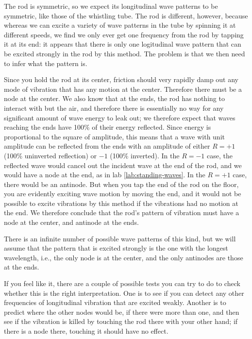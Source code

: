 The rod is symmetric, so we expect its longitudinal wave patterns
to be symmetric, like those of the whistling tube. The rod is different,
however, because whereas we can excite a variety of wave patterns in the
tube by spinning it at different speeds, we find we only ever get one
frequency from the rod by tapping it at its end: it appears that there is
only one logitudinal wave pattern that can be excited strongly in the
rod by this method. The problem is that we then need to infer what the
pattern is.

Since you hold the rod at its center, friction should very
rapidly damp out any mode of vibration that has any motion at the center.
Therefore there must be a node at the center. We also know that at the ends,
the rod has nothing to interact with but the air, and therefore there is
essentially no way for any significant amount of wave energy to leak out;
we therefore expect that waves reaching the ends have 100\% of their energy
reflected. Since energy is proportional to the square of amplitude, this means
that a wave with unit amplitude can be reflected from the ends with an amplitude
of either $R=+1$ (100\% uninverted reflection) or $-1$ (100\% inverted). In the $R=-1$
case, the reflected wave would cancel out the incident wave at the end of the rod, and
we would have a node at the end, as in lab \ref{lab:standing-waves}. In the $R=+1$ case,
there would be an antinode. But when you tap the end of the rod on the floor, you are
evidently exciting wave motion by moving the end, and it would not be possible to excite
vibrations by this method if the vibrations had no motion at the end. We therefore conclude
that the rod's pattern of vibration must have a node at the center, and antinode at the ends.

There is an infinite number of possible wave patterns of this kind, but we will assume
that the pattern that is excited strongly is the one with the longest wavelength, i.e.,
the only node is at the center, and the only antinodes are those at the ends.

If you feel like it, there are a couple of possible tests you can try to do to check whether this
is the right interpretation. One is to see if you can detect any other frequencies of longitudinal
vibration that are
excited weakly. Another is to predict where the other nodes would be, if there were more than one,
and then see if the vibration is killed by touching the rod there with your other hand; if there is
a node there, touching it should have no effect.

